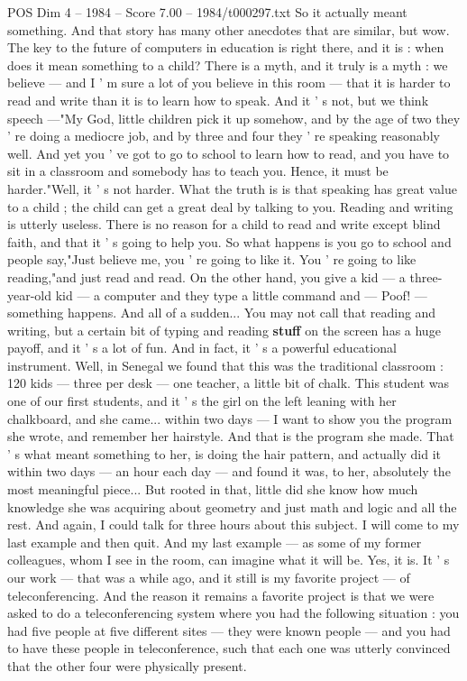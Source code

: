 \begin{textsample}{POS Dim 4 – 1984 – Score 7.00 – 1984/t000297.txt}
So it actually meant something.
And that story has many other anecdotes that are similar, but wow.
The key to the future of computers in education is right there, and it is : when does it mean something to a child?
There is a myth, and it truly is a myth : we believe — and I ' m sure a lot of you believe in this room — that it is harder to read and write than it is to learn how to speak.
And it ' s not, but we think speech —"My God, little children pick it up somehow, and by the age of two they ' re doing a mediocre job, and by three and four they ' re speaking reasonably well.
And yet you ' ve got to go to school to learn how to read, and you have to sit in a classroom and somebody has to teach you.
Hence, it must be harder."Well, it ' s not harder.
What the truth is is that speaking has great value to a child ; the child can get a great deal by talking to you.
Reading and writing is utterly useless.
There is no reason for a child to read and write except blind faith, and that it ' s going to help you.
So what happens is you go to school and people say,"Just believe me, you ' re going to like it.
You ' re going to like reading,"and just read and read.
On the other hand, you give a kid — a three-year-old kid — a computer and they type a little command and — Poof! — something happens.
And all of a sudden...
You may not call that reading and writing, but a certain bit of typing and reading \textbf{stuff} on the screen has a huge payoff, and it ' s a lot of fun.
And in fact, it ' s a powerful educational instrument.
Well, in Senegal we found that this was the traditional classroom : 120 kids — three per desk — one teacher, a little bit of chalk.
This student was one of our first students, and it ' s the girl on the left leaning with her chalkboard, and she came... within two days — I want to show you the program she wrote, and remember her hairstyle.
And that is the program she made.
That ' s what meant something to her, is doing the hair pattern, and actually did it within two days — an hour each day — and found it was, to her, absolutely the most meaningful piece...
But rooted in that, little did she know how much knowledge she was acquiring about geometry and just math and logic and all the rest.
And again, I could talk for three hours about this subject.
I will come to my last example and then quit.
And my last example — as some of my former colleagues, whom I see in the room, can imagine what it will be.
Yes, it is.
It ' s our work — that was a while ago, and it still is my favorite project — of teleconferencing.
And the reason it remains a favorite project is that we were asked to do a teleconferencing system where you had the following situation : you had five people at five different sites — they were known people — and you had to have these people in teleconference, such that each one was utterly convinced that the other four were physically present.

\end{textsample}
